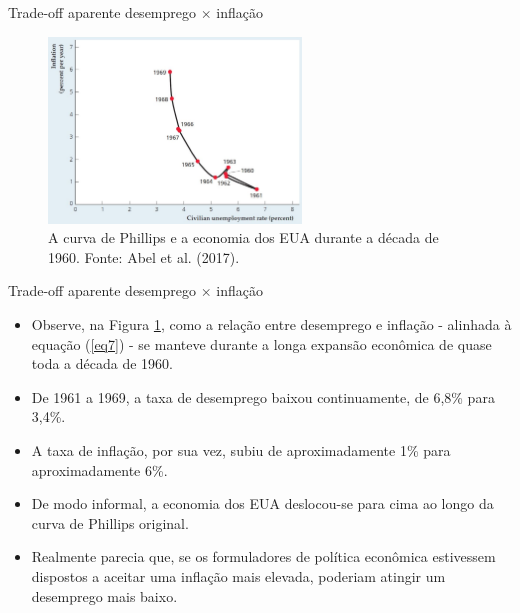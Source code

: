 \documentclass[10pt]{beamer}
\begin{document}
\begin{frame}{Trade-off aparente desemprego $\times$ inflação}
    \begin{figure}
        \centering
        \includegraphics[width=0.6\textwidth]{./figures/aula13_fig6.JPG}
        \caption{A curva de Phillips e a economia dos EUA durante a década de 1960. Fonte: Abel et al. (2017).}
        \label{fig7}
    \end{figure}
\end{frame}

\begin{frame}{Trade-off aparente desemprego $\times$ inflação}
    \begin{itemize}
        \item Observe, na Figura \ref{fig7}, como a relação entre desemprego e inflação - alinhada à equação (\ref{eq7}) - se manteve durante a longa expansão econômica de quase toda a década de 1960.
        \bigskip
        \item De 1961 a 1969, a taxa de desemprego baixou continuamente, de 6,8\% para 3,4\%.
        \bigskip
        \item A taxa de inflação, por sua vez, subiu de aproximadamente 1\% para aproximadamente 6\%.
        \bigskip
        \item De modo informal, a economia dos EUA deslocou-se para cima ao longo da curva de Phillips original.
        \bigskip
        \item Realmente parecia que, se os formuladores de política econômica estivessem dispostos a aceitar uma inflação mais elevada, poderiam atingir um desemprego mais baixo.
    \end{itemize}
\end{frame}
\end{document}
